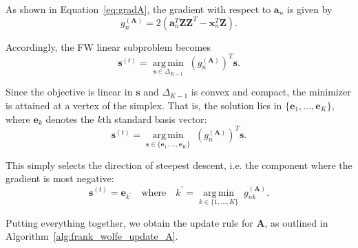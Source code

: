 \documentclass[oneside]{article}
\DeclareMathOperator*{\argmin}{arg\,min}
\begin{document}
As shown in Equation~\ref{eq:gradA}, the gradient with respect to $\mathbf{a}_n$ is given by\begin{equation}
    g_n^{(\mathbf{A})} = 2 \left( \mathbf{a}_n^T \mathbf{Z} \mathbf{Z}^T - \mathbf{x}_n^T \mathbf{Z} \right).
\end{equation}

Accordingly, the FW linear subproblem becomes\begin{equation}
    \mathbf{s}^{(t)} = \underset{\mathbf{s} \in \Delta_{K-1}}{\argmin} \;\left( g_n^{(\mathbf{A})} \right)^T \mathbf{s}.
\end{equation}

Since the objective is linear in $\mathbf{s}$ and $\Delta_{K-1}$ is convex and compact, the minimizer is attained at a vertex of the simplex. That is, the solution lies in $\{\mathbf{e}_1, \ldots, \mathbf{e}_K\}$, where $\mathbf{e}_k$ denotes the $k$th standard basis vector:\begin{equation}
    \mathbf{s}^{(t)} = \underset{\mathbf{s} \in \{\mathbf{e}_1, \ldots, \mathbf{e}_K\}}{\argmin} \;\left( g_n^{(\mathbf{A})} \right)^T \mathbf{s}.
\end{equation}

This simply selects the direction of steepest descent, i.e. the component where the gradient is most negative:\begin{equation}
    \mathbf{s}^{(t)} = \mathbf{e}_{k^\prime} \quad \text{where} \quad
    k^\prime = \underset{k \in \{1, \ldots, K\}}{\argmin} \; g_{nk}^{(\mathbf{A})}.
\end{equation}

Putting everything together, we obtain the update rule for $\mathbf{A}$, as outlined in Algorithm~\ref{alg:frank_wolfe_update_A}.
\end{document}
